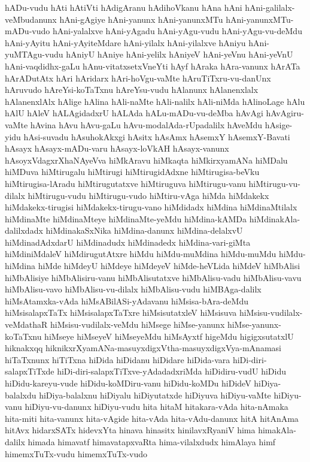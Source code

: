 {hADu-vudu
hAti
hAtiVti
hAdigAranu
hAdihoVkanu
hAna
hAni
hAni-galilalx-veMbudanunx
hAni-gAgiye
hAni-yanunx
hAni-yanunxMTu
hAni-yanunxMTu-mADu-vudo
hAni-yalalxve
hAni-yAgadu
hAni-yAgu-vudu
hAni-yAgu-vu-deMdu
hAni-yAyitu
hAni-yAyiteMdare
hAni-yilalx
hAni-yilalxve
hAniyu
hAni-yuMTAgu-vudu
hAniyU
hAniye
hAni-yelilx
hAniyeV
hAni-yeVnu
hAni-yeVnU
hAni-vaqdidhx-gaLu
hAnu-vitatxsetxVneYti
hAyf
hAraka
hAra-vanunx
hArATa
hArADutAtx
hAri
hAridarx
hAri-hoVgu-vaMte
hAruTiTxru-vu-danUnx
hAruvudo
hAreYsi-koTaTxnu
hAreYsu-vudu
hAlanunx
hAlanenxlalx
hAlanenxlAlx
hAlige
hAlina
hAli-naMte
hAli-nalilx
hAli-niMda
hAlinoLage
hAlu
hAlU
hAleV
hALAgidadxrU
hALAda
hALu-mADu-vu-deMba
hAvAgi
hAvAgiru-vaMte
hAvina
hAvu
hAvu-gaLu
hAvu-modalAda-rUpadalilx
hAveMdu
hAsige-yidu
hAsi-suvadu
hAsuhokAkxgi
hAsitx
hAsAmx
hAsemxY
hAsemxY-Bavati
hAsayx
hAsayx-mADu-varu
hAsayx-loVkAH
hAsayx-vanunx
hAsoyxVdagxrXhaNAyeVva
hiMkAravu
hiMkaqta
hiMkirxyamANa
hiMDalu
hiMDuva
hiMtirugalu
hiMtirugi
hiMtirugidAdxne
hiMtirugisa-beVku
hiMtirugisa-lAradu
hiMtirugutatxve
hiMtiruguva
hiMtirugu-vanu
hiMtirugu-vu-dilalx
hiMtirugu-vudu
hiMtirugu-vudo
hiMtiru-vAga
hiMda
hiMdakekx
hiMdakekx-tirugisi
hiMdakekx-tirugu-vano
hiMdidadx
hiMdina
hiMdinaMtilalx
hiMdinaMte
hiMdinaMteye
hiMdinaMte-yeMdu
hiMdina-kAMDa
hiMdinakAla-dalilxdadx
hiMdinakaSxNika
hiMdina-danunx
hiMdina-delalxvU
hiMdinadAdxdarU
hiMdinadudx
hiMdinadedx
hiMdina-vari-giMta
hiMdiniMdaleV
hiMdirugutAtxre
hiMdu
hiMdu-muMdina
hiMdu-muMdu
hiMdu-hiMdina
hiMde
hiMdeyU
hiMdeye
hiMdeyeV
hiMde-heVLida
hiMdeV
hiMbAlisi
hiMbAlisiye
hiMbAlisiru-vanu
hiMbAlisutatxve
hiMbAlisu-vadu
hiMbAlisu-vavu
hiMbAlisu-vavo
hiMbAlisu-vu-dilalx
hiMbAlisu-vudu
hiMBAga-dalilx
hiMsAtamxka-vAda
hiMsABilASi-yAdavanu
hiMsisa-bAra-deMdu
hiMsisalapxTaTx
hiMsisalapxTaTxre
hiMsisutatxleV
hiMsisuva
hiMsisu-vudilalx-veMdathaR
hiMsisu-vudilalx-veMdu
hiMsege
hiMse-yanunx
hiMse-yanunx-koTaTxnu
hiMseye
hiMseyeV
hiMseyeMdu
hiMsAyxtf
higeMdu
higigxsutatxlU
hiknakxqq
hiknikxrXyamANa-masuyxdigxVtha-masuyxdigxVya-mAnamasi
hiTaTxnunx
hiTiTxna
hiDida
hiDidanu
hiDidare
hiDida-vara
hiDi-diri-salapxTiTxde
hiDi-diri-salapxTiTxve-yAdadadxriMda
hiDidiru-vudU
hiDidu
hiDidu-kareyu-vude
hiDidu-koMDiru-vanu
hiDidu-koMDu
hiDideV
hiDiya-balalxdu
hiDiya-balalxnu
hiDiyalu
hiDiyutatxde
hiDiyuva
hiDiyu-vaMte
hiDiyu-vanu
hiDiyu-vu-danunx
hiDiyu-vudu
hita
hitaM
hitakara-vAda
hita-nAmaka
hita-miti
hita-vanunx
hita-vAgide
hita-vAda
hita-vAdu-danunx
hitA
hitAnAma
hitAvx
hidarxSATx
hidevxYta
hinava
hinasitx
hinilavxRyaniV
hima
himakAla-dalilx
himada
himavatf
himavatapxvaRta
hima-vilalxdudx
himAlaya
himf
himemxTuTx-vudu
himemxTuTx-vudo
}
